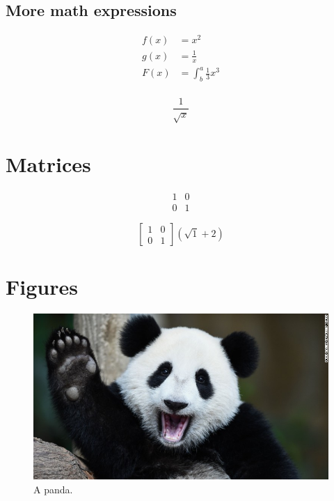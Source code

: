 \documentclass{article}
\begin{document}
\subsection{More math expressions}
\begin{align*}
    f(x) & = x^2                     \\
    g(x) & = \frac{1}{x}             \\
    F(x) & = \int^a_b \frac{1}{3}x^3 \\
\end{align*}

\begin{equation*}
    \frac{1}{\sqrt{x}}
\end{equation*}

\section{Matrices}

\begin{equation}
    \begin{matrix}
        1 & 0 \\
        0 & 1
    \end{matrix}
\end{equation}

\begin{equation}
    \left[
        \begin{matrix}
            1 & 0 \\
            0 & 1
        \end{matrix}
        \right]
    \left(\sqrt{1} + 2\right)
\end{equation}

\section{Figures}

\begin{figure}[h] %
    \includegraphics[width=\linewidth]{images/panda.jpg}
    \caption{A panda.}
    \label{fig:panda}
\end{figure}
\end{document}
